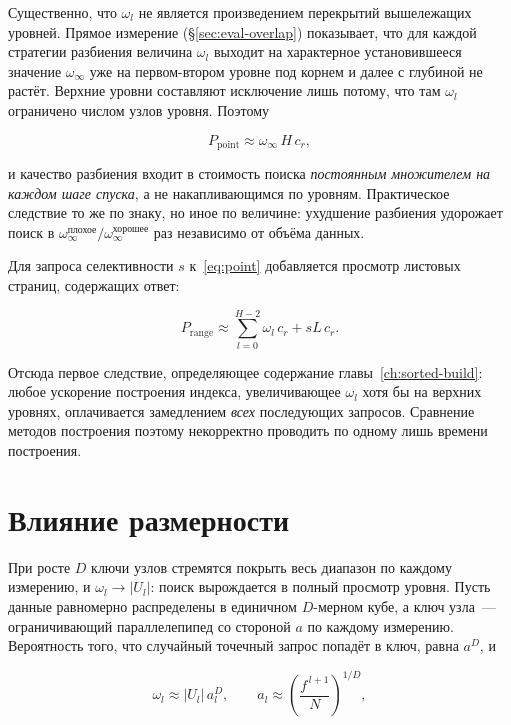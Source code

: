 Существенно, что $\omega_l$ не является произведением перекрытий вышележащих
уровней. Прямое измерение (§\ref{sec:eval-overlap}) показывает, что для каждой
стратегии разбиения величина $\omega_l$ выходит на характерное установившееся
значение $\omega_\infty$ уже на первом-втором уровне под корнем и далее с
глубиной не растёт. Верхние уровни составляют исключение лишь потому, что там
$\omega_l$ ограничено числом узлов уровня. Поэтому

\begin{equation}
\label{eq:point-steady}
P_{\text{point}} \approx \omega_\infty \, H \, c_r ,
\end{equation}

и качество разбиения входит в стоимость поиска \emph{постоянным множителем на
каждом шаге спуска}, а не накапливающимся по уровням. Практическое следствие
то же по знаку, но иное по величине: ухудшение разбиения удорожает поиск в
$\omega_\infty^{\text{плохое}} / \omega_\infty^{\text{хорошее}}$ раз
независимо от объёма данных.

Для запроса селективности $s$ к~\eqref{eq:point} добавляется просмотр листовых
страниц, содержащих ответ:

\begin{equation}
\label{eq:range}
P_{\text{range}} \approx \sum_{l=0}^{H-2} \omega_l \, c_r + s L \, c_r .
\end{equation}

Отсюда первое следствие, определяющее содержание главы~\ref{ch:sorted-build}:
любое ускорение построения индекса, увеличивающее $\omega_l$ хотя бы на верхних
уровнях, оплачивается замедлением \emph{всех} последующих запросов. Сравнение
методов построения поэтому некорректно проводить по одному лишь времени
построения.

\section{Влияние размерности}

При росте $D$ ключи узлов стремятся покрыть весь диапазон по каждому измерению,
и $\omega_l \to |U_l|$: поиск вырождается в полный просмотр уровня. Пусть
данные равномерно распределены в единичном $D$-мерном кубе, а ключ узла~---
ограничивающий параллелепипед со стороной $a$ по каждому измерению. Вероятность
того, что случайный точечный запрос попадёт в ключ, равна $a^D$, и

\begin{equation}
\label{eq:curse}
\omega_l \approx |U_l| \, a_l^{D}, \qquad a_l \approx \left(\frac{f^{\,l+1}}{N}\right)^{1/D} \! ,
\end{equation}

